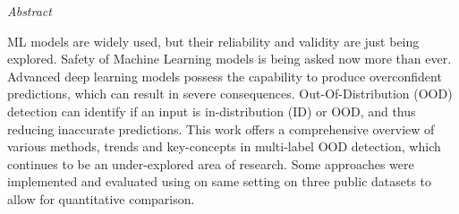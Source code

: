 
\begin{center}
{\it \large Abstract}
\vspace{0.2cm}

\begin{minipage}{0.8\textwidth}
{
ML models are widely used, but their reliability and validity are just being explored. 
Safety of Machine Learning models is being asked now more than ever. 
Advanced deep learning models possess the capability to produce overconfident predictions, 
which can result in severe consequences. 
Out-Of-Distribution (OOD) detection can identify if an input is in-distribution (ID) or OOD, 
and thus reducing inaccurate predictions.  
This work offers a comprehensive overview of various methods, trends and key-concepts in multi-label OOD detection, 
which continues to be an under-explored area of research. 
Some approaches were implemented and evaluated using on same setting on three public datasets to allow for quantitative comparison.

}
\end{minipage}
\end{center}
\vfill
\newpage{}
